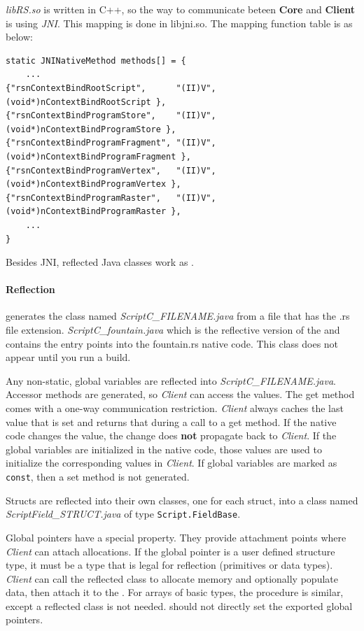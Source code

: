 \textit{libRS.so} is written in C++, so the way to communicate beteen \textbf{Core} and \textbf{Client} is using \textit{JNI}. This mapping is done in libjni.so. The mapping function table is as below:
\begin{lstlisting}[style=nonumbers] 
static JNINativeMethod methods[] = {   
    ...
{"rsnContextBindRootScript",      "(II)V", (void*)nContextBindRootScript },
{"rsnContextBindProgramStore",    "(II)V", (void*)nContextBindProgramStore },
{"rsnContextBindProgramFragment", "(II)V", (void*)nContextBindProgramFragment },
{"rsnContextBindProgramVertex",   "(II)V", (void*)nContextBindProgramVertex },
{"rsnContextBindProgramRaster",   "(II)V", (void*)nContextBindProgramRaster },
    ...
}
\end{lstlisting}

Besides JNI, reflected Java classes work as \Bridge{}.

\paragraph{Reflection} generates the class named \textit{ScriptC\_FILENAME.java} from a \RS{} file that has the .rs file extension. 
\textit{ScriptC\_fountain.java} which is the reflective version of the \RS{} and contains the entry points into the fountain.rs native code. This class does not appear until you run a build.

Any non-static, global \RS{} variables are reflected into \textit{ScriptC\_FILENAME.java}. Accessor methods are generated, so \textit{Client} can access the values. The get method comes with a one-way communication restriction. \textit{Client} always caches the last value that is set and returns that during a call to a get method. If the native \RS{} code changes the value, the change does \textbf{not} propagate back to \textit{Client}. If the global variables are initialized in the native \RS{} code, those values are used to initialize the corresponding values in \textit{Client}. If global variables are marked as \verb|const|, then a set method is not generated.

Structs are reflected into their own classes, one for each struct, into a class named \textit{ScriptField\_STRUCT.java} of type \verb|Script.FieldBase|.

Global pointers have a special property. They provide attachment points where \textit{Client} can attach allocations. If the global pointer is a user defined structure type, it must be a type that is legal for reflection (primitives or \RS{} data types). \textit{Client} can call the reflected class to allocate memory and optionally populate data, then attach it to the \RS{}. For arrays of basic types, the procedure is similar, except a reflected class is not needed. \RS{} should not directly set the exported global pointers.


